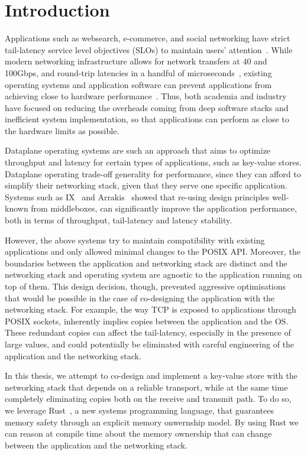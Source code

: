 \chapter{Introduction}

Applications such as websearch, e-commerce, and social networking have
strict tail-latency service level objectives (SLOs) to maintain users'
attention~\cite{url:attention}.
While modern networking infrastructure allows for network transfers at
40 and 100Gbps, and round-trip latencies in a handful of
microseconds~\cite{nicperf}, existing operating systems and application
software can prevent applications from achieving close to hardware
performance~\cite{ix}.
Thus, both academia and industry have focused on reducing the
overheads coming from deep software stacks and inefficient system
implementation, so that applications can perform as close to the hardware
limits as possible.

Dataplane operating systems are such an approach that aims to optimize
throughput and latency for certain types of applications, such as
key-value stores.
Dataplane operating trade-off generality for performance, since they
can afford to simplify their networking stack, given that they serve
one specific application.
Systems such as IX~\cite{ix} and Arrakis~\cite{arrakis} showed that
re-using design principles well-known from middleboxes, can
significantly improve the application performance,
both in terms of throughput, tail-latency and latency stability.

However, the above systems try to maintain compatibility with
existing applications and only allowed minimal changes to the POSIX
API.
Moreover, the boundaries between the application and networking stack are distinct
and the networking stack and operating system are agnostic to the application running on top of them.
This design decision, though, prevented aggressive optimisations
that would be possible in the case of co-designing the application
with the networking stack.
For example, the way TCP is exposed to applications through POSIX
sockets, inherently implies copies between the application and the
OS.
These redundant copies can affect the tail-latency, especially in the presence of large values,
and could potentially be eliminated with careful engineering of the application and the networking stack.

In this thesis, we attempt to co-design and implement a key-value
store with the networking stack that depends on a reliable transport,
while at the same time completely eliminating copies both on the
receive and transmit path.
To do so, we leverage Rust~\cite{rustbook}, a new systems programming
language, that
guarantees memory safety through an explicit memory onwernship model.
By using Rust we can reason at compile time about the memory ownership
that can change between the application and the networking stack.

